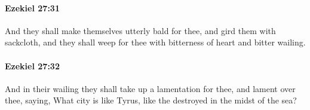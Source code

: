 		\paragraph{Ezekiel 27:31} %
			\label{EZEKIEL-27-31}

			And they shall make themselves utterly bald for thee, and gird them with sackcloth, and they shall weep for thee with bitterness of heart and bitter wailing.


		\paragraph{Ezekiel 27:32} %
			\label{EZEKIEL-27-32}

			And in their wailing they shall take up a lamentation for thee, and lament over thee, saying, What city is like Tyrus, like the destroyed in the midst of the sea?


